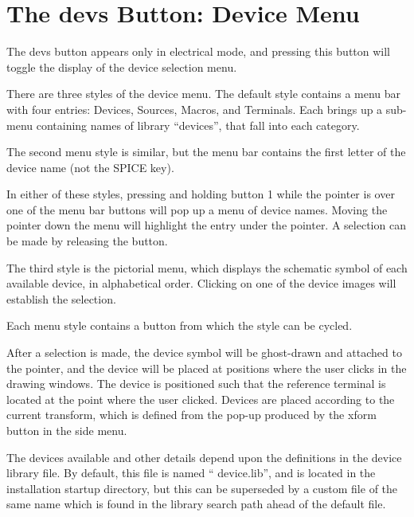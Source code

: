 \section{The {\cb devs} Button: Device Menu}
\label{devmenu}

The {\cb devs} button appears only in electrical mode, and pressing
this button will toggle the display of the device selection menu.

There are three styles of the device menu.  The default style contains
a menu bar with four entries:  {\cb Devices}, {\cb Sources}, {\cb
Macros}, and {\cb Terminals}.  Each brings up a sub-menu containing
names of library ``devices'', that fall into each category.

The second menu style is similar, but the menu bar contains the first
letter of the device name (not the SPICE key).

In either of these styles, pressing and holding button 1 while the
pointer is over one of the menu bar buttons will pop up a menu of
device names.  Moving the pointer down the menu will highlight the
entry under the pointer.  A selection can be made by releasing the
button.

The third style is the pictorial menu, which displays the schematic
symbol of each available device, in alphabetical order.  Clicking on
one of the device images will establish the selection.

Each menu style contains a button from which the style can be cycled.

After a selection is made, the device symbol will be ghost-drawn and
attached to the pointer, and the device will be placed at positions
where the user clicks in the drawing windows.  The device is
positioned such that the reference terminal is located at the point
where the user clicked.  Devices are placed according to the current
transform, which is defined from the pop-up produced by the {\cb
xform} button in the side menu.

The devices available and other details depend upon the definitions in
the device library file.  By default, this file is named ``{\vt
device.lib}'', and is located in the installation startup directory,
but this can be superseded by a custom file of the same name which is
found in the library search path ahead of the default file.

